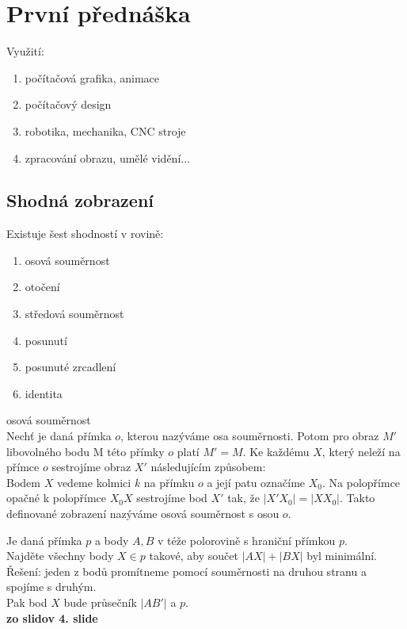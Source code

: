 \documentclass[../main.tex]{subfiles}
\begin{document}
\section{První přednáška}

Využití:
\begin{enumerate}
    \item počítačová grafika, animace
    \item počítačový design
    \item robotika, mechanika, CNC stroje
    \item zpracování obrazu, umělé vidění...
\end{enumerate}

\subsection{Shodná zobrazení}

Existuje šest shodností v rovině:
\begin{enumerate}
    \item osová souměrnost
    \item otočení
    \item středová souměrnost
    \item posunutí
    \item posunuté zrcadlení
    \item identita
\end{enumerate}

\begin{definition}
    osová souměrnost\\
    Nechť je daná přímka $o$, kterou nazýváme osa souměrnosti. Potom pro 
    obraz $M'$ libovolného bodu M této přímky $o$ platí $M' = M$. Ke každému
    $X$, který neleží na přímce $o$ sestrojíme obraz $X'$ následujícím způsobem:\\

    Bodem $X$ vedeme kolmici $k$ na přímku $o$ a její patu označíme $X_0$. Na 
    polopřímce opačné k polopřímce	 $X_0 X$ sestrojíme bod $X'$ tak, že $|X'X_0|=|XX_0|$.
    Takto definované zobrazení nazýváme osová souměrnost s osou $o$.
    \begin{example}
        Je daná přímka $p$ a body $A,B$ v téže polorovině s hraniční přímkou $p$.\\
        Najděte všechny body $X\in p$ takové, aby součet $|AX|+|BX|$ byl minimální.\\
        Řešení: jeden z bodů promítneme pomocí souměrnosti na druhou stranu a spojíme s druhým.\\
        Pak bod $X$ bude průsečník $|AB'|$ a $p$.
        \\\textbf{zo slidov 4. slide}
    \end{example}
\end{definition}
\end{document}
